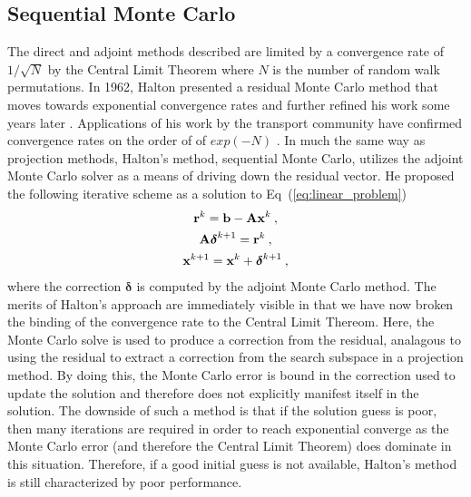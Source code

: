 \subsection{Sequential Monte Carlo}
\label{subsec:sequential_mc}
The direct and adjoint methods described are limited by a convergence
rate of $1/\sqrt{N}$ by the Central Limit Theorem where $N$ is the
number of random walk permutations. In 1962, Halton presented a
residual Monte Carlo method that moves towards exponential convergence
rates \citep{halton_1962} and further refined his work some years
later \citep{halton_1994}. Applications of his work by the transport
community have confirmed convergence rates on the order of of
$exp(-N)$ \citep{evans_2003}. In much the same way as projection
methods, Halton's method, sequential Monte Carlo, utilizes the adjoint
Monte Carlo solver as a means of driving down the residual vector. He
proposed the following iterative scheme as a solution to
Eq~(\ref{eq:linear_problem})\:
\begin{subequations}
  \begin{gather}
    \mathbf{r}^k = \mathbf{b} - \mathbf{A}\mathbf{x}^k\:,\\  
    \mathbf{A}\boldsymbol{\delta}^{k+1} = \mathbf{r}^{k}\:,\\
    \mathbf{x}^{k+1} = \mathbf{x}^k + \boldsymbol{\delta}^{k+1}\:,
  \end{gather}
  \label{eq:sequential_monte_carlo}
\end{subequations}
where the correction $\boldsymbol{\delta}$ is computed by the adjoint
Monte Carlo method. The merits of Halton's approach are immediately
visible in that we have now broken the binding of the convergence rate
to the Central Limit Thereom. Here, the Monte Carlo solve is used to
produce a correction from the residual, analagous to using the
residual to extract a correction from the search subspace in a
projection method. By doing this, the Monte Carlo error is bound in
the correction used to update the solution and therefore does not
explicitly manifest itself in the solution. The downside of such a
method is that if the solution guess is poor, then many iterations are
required in order to reach exponential converge as the Monte Carlo
error (and therefore the Central Limit Theorem) does dominate in this
situation. Therefore, if a good initial guess is not available,
Halton's method is still characterized by poor performance.

